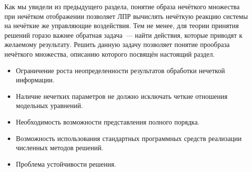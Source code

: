 Как мы увидели из предыдущего раздела, понятие образа нечёткого множества при нечётком отображении позволяет ЛПР вычислять нечёткую реакцию системы на нечёткие же управляющие воздействия. Тем не менее, для теории принятия решений горазо важнее обратная задача~--- найти действия, которые приводят к желаемому результату. Решить данную задачу позволяет понятие прообраза нечёткого множества, описанию которого посвящён настоящий раздел.

\begin{itemize}
	\item Ограничение роста неопределенности результатов обработки нечеткой информации.
	\item Наличие нечетких параметров не должно исключать четкие отношения модельных уравнений.
	\item Необходимость возможности представления полного порядка.
	\item Возможность использования стандартных программных средств реализации численных методов решений.
	\item Проблема устойчивости решения.
\end{itemize}